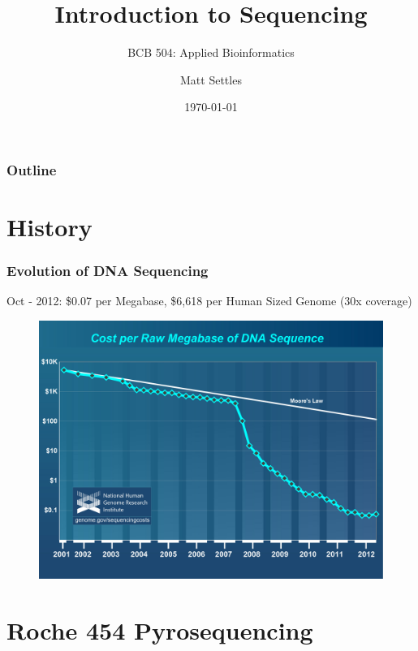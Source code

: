 \documentclass[pdf]{beamer}
\begin{document}
\title[Introduction to Sequencing]{Introduction to Sequencing}
\subtitle{BCB 504: Applied Bioinformatics\\}
\author[Matt Settles]{Matt Settles}
\date{\today}


\begin{frame}[plain]
  \titlepage
\end{frame}


\begin{frame}[plain] 
  \frametitle{Outline}
  \tableofcontents
\end{frame}

\section{History}
\begin{frame}
  \frametitle{Evolution of DNA Sequencing}
  {\footnotesize Oct - 2012: \$0.07 per Megabase, \$6,618 per Human Sized Genome (30x coverage)}
  \begin{center}
  \begin{figure}
    \includegraphics[scale=0.4]{cost_per_megabase.jpg}
  \end{figure}
  \end{center}
\end{frame}

\section{Roche 454 Pyrosequencing}
\end{document}
